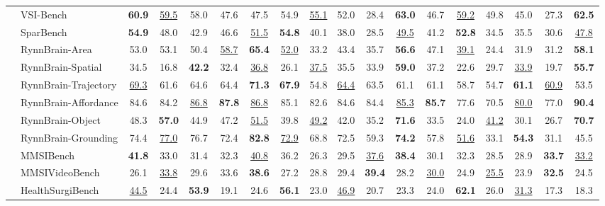 \documentclass{llmxive}
\begin{document}
\begin{table}[p]
\begin{adjustbox}{width=\textwidth}
\begin{tabular}{@{}c l|>{\columncolor{columnours}}ccccc|>{\columncolor{columnours}}cccccc|>{\columncolor{columnours}}ccccc@{}}
        & VSI-Bench & \textbf{60.9} & \underline{59.5} & 58.0 & 47.6 & 47.5 & 54.9 & \underline{55.1} & 52.0 & 28.4 & \textbf{63.0} & 46.7 & \underline{59.2} & 49.8 & 45.0 & 27.3 & \textbf{62.5} \\
        & SparBench & \textbf{54.9} & 48.0 & 42.9 & 46.6 & \underline{51.5} & \textbf{54.8} & 40.1 & 38.0 & 28.5 & \underline{49.5} & 41.2 & \textbf{52.8} & 34.5 & 35.5 & 30.6 & \underline{47.8} \\
        & RynnBrain-Area & 53.0 & 53.1 & 50.4 & \underline{58.7} & \textbf{65.4} & \underline{52.0} & 33.2 & 43.4 & 35.7 & \textbf{56.6} & 47.1 & \underline{39.1} & 24.4 & 31.9 & 31.2 & \textbf{58.1} \\
        & RynnBrain-Spatial & 34.5 & 16.8 & \textbf{42.2} & 32.4 & \underline{36.8} & 26.1 & \underline{37.5} & 35.5 & 33.9 & \textbf{59.0} & 37.2 & 22.6 & 29.7 & \underline{33.9} & 19.7 & \textbf{55.7} \\
        & RynnBrain-Trajectory & \underline{69.3} & 61.6 & 64.6 & 64.4 & \textbf{71.3} & \textbf{67.9} & 54.8 & \underline{64.4} & 63.5 & 61.1 & 61.1 & 58.7 & 54.7 & \textbf{61.1} & \underline{60.9} & 53.5 \\
        & RynnBrain-Affordance & 84.6 & 84.2 & \underline{86.8} & \textbf{87.8} & \underline{86.8} & 85.1 & 82.6 & 84.6 & 84.4 & \underline{85.3} & \textbf{85.7} & 77.6 & 70.5 & \underline{80.0} & 77.0 & \textbf{90.4} \\
        & RynnBrain-Object & 48.3 & \textbf{57.0} & 44.9 & 47.2 & \underline{51.5} & 39.8 & \underline{49.2} & 42.0 & 35.2 & \textbf{71.6} & 33.5 & 24.0 & \underline{41.2} & 30.1 & 26.7 & \textbf{70.7} \\
        & RynnBrain-Grounding & 74.4 & \underline{77.0} & 76.7 & 72.4 & \textbf{82.8} & \underline{72.9} & 68.8 & 72.5 & 59.3 & \textbf{74.2} & 57.8 & \underline{51.6} & 33.1 & \textbf{54.3} & 31.1 & 45.5 \\
        & MMSIBench & \textbf{41.8} & 33.0 & 31.4 & 32.3 & \underline{40.8} & 36.2 & 26.3 & 29.5 & \underline{37.6} & \textbf{38.4} & 30.1 & 32.3 & 28.5 & 28.9 & \textbf{33.7} & \underline{33.2} \\
        & MMSIVideoBench & 26.1 & \underline{33.8} & 29.6 & 33.6 & \textbf{38.6} & 27.2 & 28.8 & 29.4 & \textbf{39.4} & 28.2 & \underline{30.0} & 24.9 & \underline{25.5} & 23.9 & \textbf{32.5} & 24.5 \\
        & HealthSurgiBench & \underline{44.5} & 24.4 & \textbf{53.9} & 19.1 & 24.6 & \textbf{56.1} & 23.0 & \underline{46.9} & 20.7 & 23.3 & 24.0 & \textbf{62.1} & 26.0 & \underline{31.3} & 17.3 & 18.3 \\

\end{tabular}
\end{adjustbox}
\end{table}
\end{document}

